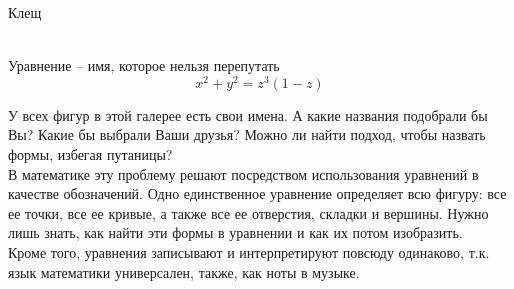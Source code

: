 \documentclass[ru]{./../../common/SurferDesc}%
\begin{document}
\footnotesize

 

\begin{surferPage}
  \begin{surferTitle}Клещ\end{surferTitle}  \\
Уравнение – имя, которое нельзя перепутать\\
\smallskip
\[x^2 + y^2	= z^3	(1 - z) \]


\singlespacing
У всех фигур в этой галерее есть свои имена. А какие названия подобрали бы Вы? Какие бы выбрали Ваши друзья? Можно ли найти подход, чтобы назвать формы, избегая путаницы?\\
\vspace{0.3cm}
В математике эту проблему решают посредством использования уравнений в качестве обозначений. Одно единственное уравнение определяет всю фигуру: все ее точки, все ее кривые, а также все ее отверстия, складки и вершины. Нужно лишь знать, как найти эти формы в уравнении и как их потом изобразить.\\
\vspace{0.3cm}
Кроме того, уравнения записывают и интерпретируют повсюду одинаково, т.к. язык математики универсален, также, как ноты в музыке.

  \begin{surferText}
     \end{surferText}
\end{surferPage}
\end{document}
